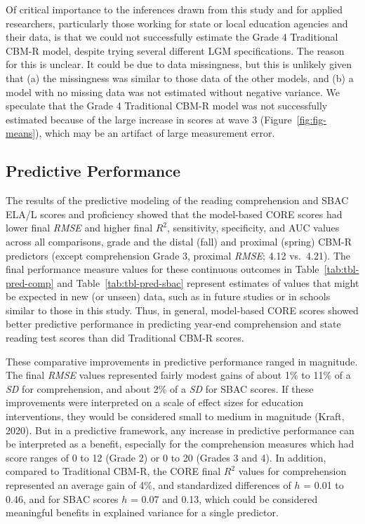 \documentclass[
  english,
  man, fleqn, noextraspace]{apa6}
\begin{document}
Of critical importance to the inferences drawn from this study and for applied researchers, particularly those working for state or local education agencies and their data, is that we could not successfully estimate the Grade 4 Traditional CBM-R model, despite trying several different LGM specifications. The reason for this is unclear. It could be due to data missingness, but this is unlikely given that (a) the missingness was similar to those data of the other models, and (b) a model with no missing data was not estimated without negative variance. We speculate that the Grade 4 Traditional CBM-R model was not successfully estimated because of the large increase in scores at wave 3 (Figure~\ref{fig:fig-means}), which may be an artifact of large measurement error.

\hypertarget{predictive-performance}{%
\subsection{Predictive Performance}\label{predictive-performance}}

The results of the predictive modeling of the reading comprehension and SBAC ELA/L scores and proficiency showed that the model-based CORE scores had lower final \emph{RMSE} and higher final \(R^2\), sensitivity, specificity, and AUC values across all comparisons, grade and the distal (fall) and proximal (spring) CBM-R predictors (except comprehension Grade 3, proximal \emph{RMSE}; 4.12 vs.~4.21). The final performance measure values for these continuous outcomes in Table~\ref{tab:tbl-pred-comp} and Table~\ref{tab:tbl-pred-sbac} represent estimates of values that might be expected in new (or unseen) data, such as in future studies or in schools similar to those in this study. Thus, in general, model-based CORE scores showed better predictive performance in predicting year-end comprehension and state reading test scores than did Traditional CBM-R scores.

These comparative improvements in predictive performance ranged in magnitude. The final \emph{RMSE} values represented fairly modest gains of about 1\% to 11\% of a \emph{SD} for comprehension, and about 2\% of a \emph{SD} for SBAC scores. If these improvements were interpreted on a scale of effect sizes for education interventions, they would be considered small to medium in magnitude (Kraft, 2020). But in a predictive framework, any increase in predictive performance can be interpreted as a benefit, especially for the comprehension measures which had score ranges of 0 to 12 (Grade 2) or 0 to 20 (Grades 3 and 4). In addition, compared to Traditional CBM-R, the CORE final \(R^2\) values for comprehension represented an average gain of 4\%, and standardized differences of \(h\) = 0.01 to 0.46, and for SBAC scores \(h\) = 0.07 and 0.13, which could be considered meaningful benefits in explained variance for a single predictor.
\end{document}
